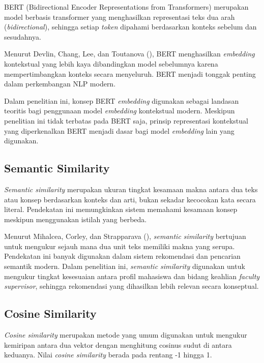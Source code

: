 BERT (Bidirectional Encoder Representations from Transformers) merupakan model berbasis transformer yang menghasilkan representasi teks dua arah (\textit{bidirectional}), sehingga setiap \textit{token} dipahami berdasarkan konteks sebelum dan sesudahnya.

Menurut Devlin, Chang, Lee, dan Toutanova (\citeyear{devlin2019bert}), BERT menghasilkan \textit{embedding} kontekstual yang lebih kaya dibandingkan model sebelumnya karena mempertimbangkan konteks secara menyeluruh. BERT menjadi tonggak penting dalam perkembangan NLP modern.

Dalam penelitian ini, konsep BERT \textit{embedding} digunakan sebagai landasan teoritis bagi penggunaan model \textit{embedding} kontekstual modern. Meskipun penelitian ini tidak terbatas pada BERT saja, prinsip representasi kontekstual yang diperkenalkan BERT menjadi dasar bagi model \textit{embedding} lain yang digunakan.

\subsection{Semantic Similarity}\label{semantic-similarity}

\textit{Semantic similarity} merupakan ukuran tingkat kesamaan makna antara dua teks atau konsep berdasarkan konteks dan arti, bukan sekadar kecocokan kata secara literal. Pendekatan ini memungkinkan sistem memahami kesamaan konsep meskipun menggunakan istilah yang berbeda.

Menurut Mihalcea, Corley, dan Strapparava (\citeyear{mihalcea2006semantic}), \textit{semantic similarity} bertujuan untuk mengukur sejauh mana dua unit teks memiliki makna yang serupa. Pendekatan ini banyak digunakan dalam sistem rekomendasi dan pencarian semantik modern. Dalam penelitian ini, \textit{semantic similarity} digunakan untuk mengukur tingkat kesesuaian antara profil mahasiswa dan bidang keahlian \textit{faculty supervisor}, sehingga rekomendasi yang dihasilkan lebih relevan secara konseptual.

\subsection{Cosine Similarity}\label{cosine-similarity}

\textit{Cosine similarity} merupakan metode yang umum digunakan untuk mengukur kemiripan antara dua vektor dengan menghitung cosinus sudut di antara keduanya. Nilai \textit{cosine similarity} berada pada rentang -1 hingga 1.

